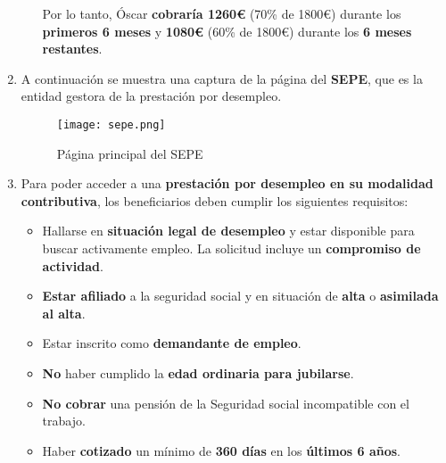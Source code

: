 \begin{enumerate}[label=\alph*)]
\begin{itemize}
         Por lo tanto, Óscar \textbf{cobraría 1260€} (70\% de 1800€) durante los \textbf{primeros 6 meses} y \textbf{1080€} (60\% de 1800€) durante los \textbf{6 meses restantes}.
    \end{itemize}

    \item A continuación se muestra una captura de la página del \textbf{SEPE}, que es la entidad gestora de la prestación por desempleo.

    \begin{figure}[H]
        \centering
        \texttt{[image: sepe.png]}
        \caption{Página principal del SEPE}
    \end{figure}

    \item Para poder acceder a una \textbf{prestación por desempleo en su modalidad contributiva}, los beneficiarios deben cumplir los siguientes requisitos:
    \begin{itemize}
        \item Hallarse en \textbf{situación legal de desempleo} y estar disponible para buscar activamente empleo. La solicitud incluye un \textbf{compromiso de actividad}.
        \item \textbf{Estar afiliado} a la seguridad social y en situación de \textbf{alta} o \textbf{asimilada al alta}.
        \item Estar inscrito como \textbf{demandante de empleo}.
        \item \textbf{No} haber cumplido la \textbf{edad ordinaria para jubilarse}.
        \item \textbf{No cobrar} una pensión de la Seguridad social incompatible con el trabajo.
        \item Haber \textbf{cotizado} un mínimo de \textbf{360 días} en los \textbf{últimos 6 años}.
    \end{itemize}
\end{enumerate}














\newpage




